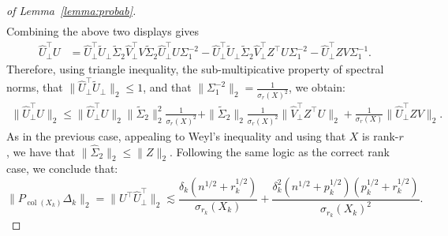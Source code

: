 \documentclass{amsart}
\DeclareMathOperator*{\col}{col}
\begin{document}
\begin{proof}[of Lemma~\ref{lemma:probab}]
{\begin{align*}
\end{align*}
Combining the above two displays gives
\begin{align*}
\widehat U_{\perp}^{\top}U &= \widehat U_{\perp}^{\top} \widetilde U_\perp \widetilde \Sigma_2\widehat V_{\perp}^{\top}V \widetilde\Sigma_2  \widehat U_{\perp}^{\top}U\Sigma_1^{-2} -\widehat U_{\perp}^{\top} \widetilde U_\perp \widetilde \Sigma_2 \widehat V_{\perp}^{\top}Z^{\top}U\Sigma_{1}^{-2} - \widehat U_{\perp}^{\top}ZV\Sigma_1^{-1}.
\end{align*}
Therefore, using triangle inequality, the sub-multipicative property of spectral norms, that $\|\widehat U_{\perp}^{\top} \widetilde U_\perp\|_2 \leq 1$, and that $\|\Sigma_1^{-2}\|_2 =\frac{1}{\sigma_r(X)^2}$, we obtain:
\begin{align*}
\|\widehat U_{\perp}^{\top}U\|_2 \leq \|\widehat U_{\perp}^{\top}U\|_2 \|\widetilde\Sigma_2\|_2^2\frac1{\sigma_r(X)^2} + \|\widetilde\Sigma_2\|_2\frac1{\sigma_r(X)^2}\|\widehat V_{\perp}^{\top}Z^{\top}U\|_2 + \frac1{\sigma_r(X)}\|\widehat U_{\perp}^{\top}ZV\|_2.
\end{align*}
As in the previous case, appealing to Weyl's inequality and using that $X$ is rank-$r$, we have that $\|\widehat \Sigma_2\|_2 \leq \|Z\|_2$. Following the same logic as the correct rank case, we conclude that:
$$
\|P_{{\col (X_k)}}\Delta_k\|_2 = \|U^{\top}\widehat U_{\perp}^{\top}\|_2 \lesssim \frac{\delta_k(n^{1/2}+r_k^{1/2})}{\sigma_{r_k}(X_k)}+ \frac{\delta_k^2(n^{1/2} + p_k^{1/2})(p_k^{1/2}+r_k^{1/2})}{\sigma_{r_k}(X_k)^2}.
$$}
\end{proof}
\end{document}
